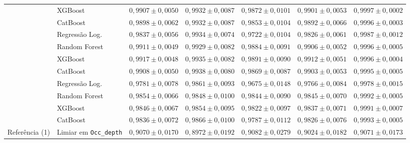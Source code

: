 \begin{table}[htbp]
{\begin{tabular}{llccccc}
 & XGBoost & $0{,}9907 \pm 0{,}0050$ & $0{,}9932 \pm 0{,}0087$ & $0{,}9872 \pm 0{,}0101$ & $0{,}9901 \pm 0{,}0053$ & $0{,}9997 \pm 0{,}0002$ \\
 & CatBoost & $0{,}9898 \pm 0{,}0062$ & $0{,}9932 \pm 0{,}0087$ & $0{,}9853 \pm 0{,}0104$ & $0{,}9892 \pm 0{,}0066$ & $0{,}9996 \pm 0{,}0003$ \\
\hline
{} & Regressão Log. & $0{,}9837 \pm 0{,}0056$ & $0{,}9934 \pm 0{,}0074$ & $0{,}9722 \pm 0{,}0104$ & $0{,}9826 \pm 0{,}0061$ & $0{,}9987 \pm 0{,}0012$ \\
 & Random Forest & $0{,}9911 \pm 0{,}0049$ & $0{,}9929 \pm 0{,}0082$ & $0{,}9884 \pm 0{,}0091$ & $0{,}9906 \pm 0{,}0052$ & $0{,}9996 \pm 0{,}0005$ \\
 & XGBoost & $0{,}9917 \pm 0{,}0048$ & $0{,}9935 \pm 0{,}0082$ & $0{,}9891 \pm 0{,}0090$ & $0{,}9912 \pm 0{,}0051$ & $0{,}9996 \pm 0{,}0004$ \\
 & CatBoost & $0{,}9908 \pm 0{,}0050$ & $0{,}9938 \pm 0{,}0080$ & $0{,}9869 \pm 0{,}0087$ & $0{,}9903 \pm 0{,}0053$ & $0{,}9995 \pm 0{,}0005$ \\
\hline
{} & Regressão Log. & $0{,}9781 \pm 0{,}0078$ & $0{,}9861 \pm 0{,}0093$ & $0{,}9675 \pm 0{,}0148$ & $0{,}9766 \pm 0{,}0084$ & $0{,}9978 \pm 0{,}0015$ \\
 & Random Forest & $0{,}9854 \pm 0{,}0066$ & $0{,}9848 \pm 0{,}0100$ & $0{,}9844 \pm 0{,}0090$ & $0{,}9845 \pm 0{,}0070$ & $0{,}9992 \pm 0{,}0005$ \\
 & XGBoost & $0{,}9846 \pm 0{,}0067$ & $0{,}9854 \pm 0{,}0095$ & $0{,}9822 \pm 0{,}0097$ & $0{,}9837 \pm 0{,}0071$ & $0{,}9991 \pm 0{,}0007$ \\
 & CatBoost & $0{,}9836 \pm 0{,}0072$ & $0{,}9866 \pm 0{,}0100$ & $0{,}9787 \pm 0{,}0112$ & $0{,}9826 \pm 0{,}0076$ & $0{,}9993 \pm 0{,}0005$ \\
\hline
Referência (1) & Limiar em \texttt{Occ\_depth} & $0{,}9070 \pm 0{,}0170$ & $0{,}8972 \pm 0{,}0192$ & $0{,}9082 \pm 0{,}0279$ & $0{,}9024 \pm 0{,}0182$ & $0{,}9071 \pm 0{,}0173$ \\
\hline
\end{tabular}}
\end{table}

